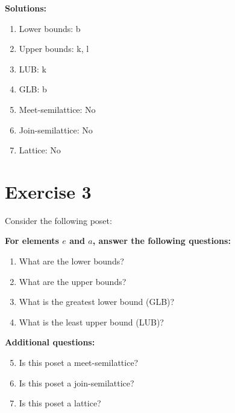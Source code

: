 \documentclass{article}
\begin{document}
\textbf{Solutions:}
\begin{enumerate}
    \item Lower bounds: {b}
    \item Upper bounds: {k, l}
    \item LUB: k
    \item GLB: b
    \item Meet-semilattice: No
    \item Join-semilattice: No
    \item Lattice: No
\end{enumerate}
\newpage
\section*{Exercise 3}
Consider the following poset:
\begin{center}
\end{center}

    \textbf{For elements $e$ and $a$, answer the following questions:}
\begin{enumerate}
    \item What are the lower bounds?
    \item What are the upper bounds?
    \item What is the greatest lower bound (GLB)?
    \item What is the least upper bound (LUB)?
\end{enumerate}
    \hspace*{3ex} \textbf{Additional questions:}
\begin{enumerate}
    \setcounter{enumi}{4}
    \item Is this poset a meet-semilattice?
    \item Is this poset a join-semilattice?
    \item Is this poset a lattice?
\end{enumerate}
\end{document}

